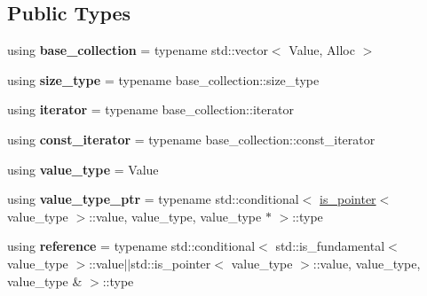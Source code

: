 \subsection*{Public Types}
\begin{DoxyCompactItemize}
\item 
\hypertarget{classrs_1_1_lazy_flat_set_adf2eab7a354a5d355d59ca7f15133d1d}{using {\bfseries base\+\_\+collection} = typename std\+::vector$<$ Value, Alloc $>$}\label{classrs_1_1_lazy_flat_set_adf2eab7a354a5d355d59ca7f15133d1d}

\item 
\hypertarget{classrs_1_1_lazy_flat_set_a6e0778124a9f2727c188c43c129cf34b}{using {\bfseries size\+\_\+type} = typename base\+\_\+collection\+::size\+\_\+type}\label{classrs_1_1_lazy_flat_set_a6e0778124a9f2727c188c43c129cf34b}

\item 
\hypertarget{classrs_1_1_lazy_flat_set_a49d91b95a28692e53ab6b0a487862065}{using {\bfseries iterator} = typename base\+\_\+collection\+::iterator}\label{classrs_1_1_lazy_flat_set_a49d91b95a28692e53ab6b0a487862065}

\item 
\hypertarget{classrs_1_1_lazy_flat_set_a3060161b3a52f713d086620993093a59}{using {\bfseries const\+\_\+iterator} = typename base\+\_\+collection\+::const\+\_\+iterator}\label{classrs_1_1_lazy_flat_set_a3060161b3a52f713d086620993093a59}

\item 
\hypertarget{classrs_1_1_lazy_flat_set_ab7de742924e7b252dab47f93990785fb}{using {\bfseries value\+\_\+type} = Value}\label{classrs_1_1_lazy_flat_set_ab7de742924e7b252dab47f93990785fb}

\item 
\hypertarget{classrs_1_1_lazy_flat_set_a49156f05e1342af92e1499952606c1f1}{using {\bfseries value\+\_\+type\+\_\+ptr} = typename std\+::conditional$<$ \hyperlink{structrs_1_1_lazy_flat_set_1_1is__pointer}{is\+\_\+pointer}$<$ value\+\_\+type $>$\+::value, value\+\_\+type, value\+\_\+type $\ast$ $>$\+::type}\label{classrs_1_1_lazy_flat_set_a49156f05e1342af92e1499952606c1f1}

\item 
\hypertarget{classrs_1_1_lazy_flat_set_aa53ec129bdf69cce6fd44e08bef795d1}{using {\bfseries reference} = typename std\+::conditional$<$ std\+::is\+\_\+fundamental$<$ value\+\_\+type $>$\+::value$\vert$$\vert$std\+::is\+\_\+pointer$<$ value\+\_\+type $>$\+::value, value\+\_\+type, value\+\_\+type \& $>$\+::type}\label{classrs_1_1_lazy_flat_set_aa53ec129bdf69cce6fd44e08bef795d1}


\end{DoxyCompactItemize}
